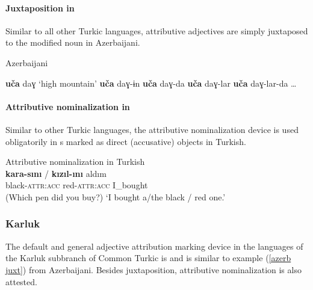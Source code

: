\paragraph*{Juxtaposition in }
Similar to all other Turkic languages, attributive adjectives are simply juxtaposed to the modified noun in Azerbaijani.
\begin{exe}
\settowidth{}
\ex
\label{azerb juxt}
\rm{Azerbaijani \citep[59–60]{siraliev-etal1971}}
\begin{xlist}
\ex	\textbf{uča} daɣ 		\rm{‘high mountain’}	
\ex	\textbf{uča} daɣ-ɨn						
\ex	\textbf{uča} daɣ-da 						
\ex	\textbf{uča} daɣ-lar 						
\ex	\textbf{uča} daɣ-lar-da 					
\ex\dots
\end{xlist}
\end{exe}

\paragraph*{Attributive nominalization in }
\label{turkish synchr}
Similar to other Turkic languages, the attributive nominalization device is used obligatorily in s marked as direct (accusative) objects in Turkish.
\begin{exe}
\ex 
\label{turkish headless acc}	
\rm{Attributive nominalization in Turkish \citep[7]{benzing1993b}}\\ 
\gll	\textbf{kara-sını} / \textbf{kızıl-ını} aldım\\
 	black-\textsc{attr:acc} { } red-\textsc{attr:acc} I\_bought\\
\glt 	(Which pen did you buy?) ‘I bought a/the black / red one.’
\end{exe}
 
\subsubsection{Karluk}
The default and general adjective attribution marking device in the languages of the Karluk subbranch of Common Turkic is  and is similar to example (\ref{azerb juxt}) from Azerbaijani. Besides juxtaposition, attributive nominalization is also attested.

